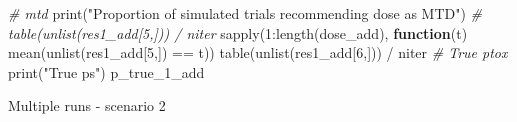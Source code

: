 \documentclass[
]{article}
\newenvironment{Shaded}{\begin{snugshade}}{\end{snugshade}}
\newcommand{\CommentTok}[1]{\textcolor[rgb]{0.56,0.35,0.01}{\textit{#1}}}
\newcommand{\ControlFlowTok}[1]{\textcolor[rgb]{0.13,0.29,0.53}{\textbf{#1}}}
\newcommand{\DecValTok}[1]{\textcolor[rgb]{0.00,0.00,0.81}{#1}}
\newcommand{\FunctionTok}[1]{\textcolor[rgb]{0.00,0.00,0.00}{#1}}
\newcommand{\NormalTok}[1]{#1}
\newcommand{\SpecialCharTok}[1]{\textcolor[rgb]{0.00,0.00,0.00}{#1}}
\newcommand{\StringTok}[1]{\textcolor[rgb]{0.31,0.60,0.02}{#1}}
\begin{document}
\begin{Shaded}
\begin{Highlighting}[]
\CommentTok{\# mtd}
\FunctionTok{print}\NormalTok{(}\StringTok{"Proportion of simulated trials recommending dose as MTD"}\NormalTok{)}
\CommentTok{\# table(unlist(res1\_add[5,])) / niter}
\FunctionTok{sapply}\NormalTok{(}\DecValTok{1}\SpecialCharTok{:}\FunctionTok{length}\NormalTok{(dose\_add), }\ControlFlowTok{function}\NormalTok{(t) }\FunctionTok{mean}\NormalTok{(}\FunctionTok{unlist}\NormalTok{(res1\_add[}\DecValTok{5}\NormalTok{,]) }\SpecialCharTok{==}\NormalTok{ t))}
\FunctionTok{table}\NormalTok{(}\FunctionTok{unlist}\NormalTok{(res1\_add[}\DecValTok{6}\NormalTok{,])) }\SpecialCharTok{/}\NormalTok{ niter}
\CommentTok{\# True ptox}
\FunctionTok{print}\NormalTok{(}\StringTok{"True p\textquotesingle{}s"}\NormalTok{)}
\NormalTok{p\_true\_1\_add}
\end{Highlighting}
\end{Shaded}

Multiple runs - scenario 2
\end{document}

